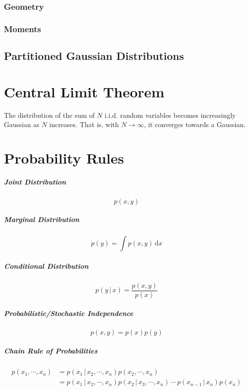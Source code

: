 \documentclass[a4paper, 11pt, accentcolor = tud3b]{tudreport}
\newcommand{\given}{\ensuremath{\,\vert\,}}
\newcommand{\dif}[1]{\ensuremath{\,\mathrm{d}#1}}
\begin{document}
				\subsubsection{Geometry} %

				\subsubsection{Moments} %

			\subsection{Partitioned Gaussian Distributions} %

		\section{Central Limit Theorem}
			The distribution of the sum of \(N\) i.i.d. random variables becomes increasingly Gaussian as \(N\) increases. That is, with \(N \to \infty\), it converges towards a Gaussian.

		\section{Probability Rules}
			\subparagraph{Joint Distribution}
			\begin{equation}
				p(x, y)
			\end{equation}

			\subparagraph{Marginal Distribution}
			\begin{equation}
				p(y) = \int p(x, y) \dif{x}
			\end{equation}

			\subparagraph{Conditional Distribution}
			\begin{equation}
				p(y \given x) = \frac{p(x, y)}{p(x)}
			\end{equation}

			\subparagraph{Probabilistic/Stochastic Independence}
			\begin{equation}
				p(x, y) = p(x) p(y)
			\end{equation}

			\subparagraph{Chain Rule of Probabilities}
			\begin{align}
				p(x_1, \cdots, x_n) &= p(x_1 \given x_2, \cdots, x_n) p(x_2, \cdots, x_n) \\
					&= p(x_1 \given x_2, \cdots, x_n) p(x_2 \given x_3, \cdots, x_n) \,\cdots\, p(x_{n - 1} \given x_n) p(x_n)
			\end{align}
\end{document}
